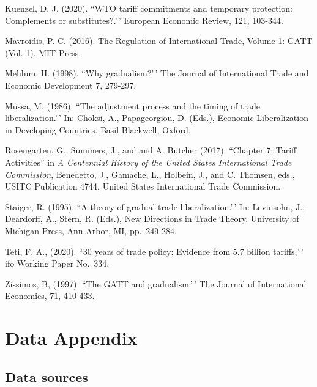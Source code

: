 \documentclass[
  12pt,
]{article}
\begin{document}
Kuenzel, D. J. (2020). ``WTO tariff commitments and temporary protection: Complements or substitutes?.'\,' European Economic Review, 121, 103-344.

Mavroidis, P. C. (2016). The Regulation of International Trade, Volume 1: GATT (Vol. 1). MIT Press.

Mehlum, H. (1998). ``Why gradualism?'\,' The Journal of International Trade and Economic Development 7, 279-297.

Mussa, M. (1986). ``The adjustment process and the timing of trade liberalization.'\,' In: Choksi, A., Papageorgiou, D. (Eds.), Economic Liberalization in Developing Countries. Basil Blackwell, Oxford.

Rosengarten, G., Summers, J., and and A. Butcher (2017). ``Chapter 7: Tariff Activities'' in \emph{A Centennial History of the United States International Trade Commission}, Benedetto, J., Gamache, L., Holbein, J., and C. Thomsen, eds., USITC Publication 4744, United States International Trade Commission.

Staiger, R. (1995). ``A theory of gradual trade liberalization.'\,' In: Levinsohn, J., Deardorff, A., Stern, R. (Eds.), New Directions in Trade Theory. University of Michigan Press, Ann Arbor, MI, pp.~249-284.

Teti, F. A., (2020). ``30 years of trade policy: Evidence from 5.7 billion tariffs,'\,' ifo Working Paper No.~334.

Zissimos, B, (1997). ``The GATT and gradualism.'\,' The Journal of International Economics, 71, 410-433.

\newpage

\hypertarget{dataappendix}{%
\section{Data Appendix}\label{dataappendix}}

\hypertarget{sources}{%
\subsection{Data sources}\label{sources}}
\end{document}
